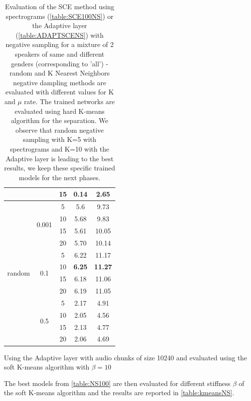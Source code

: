 \documentclass[master, tikz, final,11pt, dvipdfmx]{iscs-thesis}
\begin{document}
\begin{table}[h!]
\begin{subtable}{.5\linewidth}
\begin{tabular}{l|c|c|c|c}
 &  & 15 & 0.14 & 2.65 \\
\hline
\multirow{12}{*}{random}  & \multirow{4}{*}{0.001} & 5 & 5.6 & 9.73 \\ 
 &  & 10 & 5.68 & 9.83 \\
 &  & 15 & 5.61 & 10.05 \\
 &  & 20 & 5.70 & 10.14 \\
\cline{2-5}
 & \multirow{4}{*}{0.1} & 5 & 6.22 & 11.17 \\
 &  & 10 & \cellcolor{green}\textbf{6.25} & \cellcolor{green}\textbf{11.27} \\
 &  & 15 & 6.18 & 11.06 \\
 &  & 20 & 6.19 & 11.05 \\
\cline{2-5}
 & \multirow{4}{*}{0.5} & 5 & 2.17 & 4.91 \\
 &  & 10 & 2.05 & 4.56 \\
 &  & 15 & 2.13 & 4.77 \\
 &  & 20 & 2.06 & 4.69 \\
\end{tabular}
\caption{Using the Adaptive layer with audio chunks of size 10240 and evaluated using the soft K-means algorithm with $\beta=10$}
\label{table:ADAPTSCENS}
\end{subtable}
\caption[Evaluation of the SCE method using spectrograms (\ref{table:SCE100NS}) or the Adaptive layer (\ref{table:ADAPTSCENS}) with negative sampling for a mixture of 2 speakers of same and different genders]{Evaluation of the SCE method using spectrograms (\ref{table:SCE100NS}) or the Adaptive layer (\ref{table:ADAPTSCENS}) with negative sampling for a mixture of 2 speakers of same and different genders (corresponding to 'all') - random and K Nearest Neighbors negative dampling methods are evaluated with different values for K and $\mu$ rate. The trained networks are evaluated using hard K-means algorithm for the separation. We observe that random negative sampling with K=5 with spectrograms and K=10 with the Adaptive layer is leading to the best results, we keep these specific trained models for the next phases.}
\label{table:NS100}
\end{table}

The best models from \autoref{table:NS100} are then evaluated for different stiffness $\beta$ of the soft K-means algorithm and the results are reported in \autoref{table:kmeansNS}.
\end{document}
